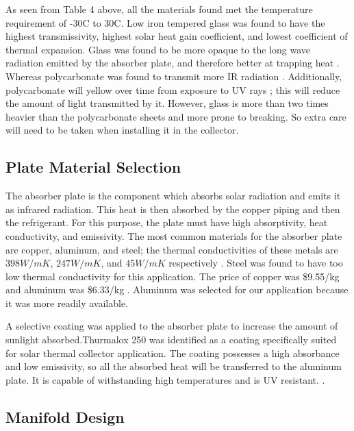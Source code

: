 \medskip
As seen from Table 4 above, all the materials found met the temperature requirement of -30\textdegree C to 30\textdegree C. Low iron tempered glass was found to have the highest transmissivity, highest solar heat gain coefficient, and lowest coefficient of thermal expansion. Glass was found to be more opaque to the long wave radiation emitted by the absorber plate, and therefore better at trapping heat \cite{low_iron_glass_vs_regular}. Whereas polycarbonate was found to transmit more IR radiation \cite{plexiglass}. Additionally, polycarbonate will yellow over time from exposure to UV rays \cite{polycarbonate_yellowing}; this will reduce the amount of light transmitted by it. However, glass is more than two times heavier than the polycarbonate sheets and more prone to breaking. So extra care will need to be taken when installing it in the collector.

\subsection{Plate Material Selection}

The absorber plate is the component which absorbs solar radiation and emits it as infrared radiation. This heat is then absorbed by the copper piping and then the refrigerant. For this purpose, the plate must have high absorptivity, heat conductivity, and emissivity. The most common materials for the absorber plate are copper, aluminum, and steel; the thermal conductivities of these metals are $398 W/mK$, $247 W/mK$, and $45 W/mK$ respectively \cite{thermally_conductive_materials} \cite{thermal_conductivity_of_steel}. Steel was found to have too low thermal conductivity for this application. The price of copper was \$9.55/kg \cite{copper_prices} and aluminum was \$6.33/kg \cite{aluminum_prices}. Aluminum was selected for our application because it was more readily available.

\medskip
A selective coating was applied to the absorber plate to increase the amount of sunlight absorbed.Thurmalox 250 was identified as a coating specifically suited for solar thermal collector application. The coating possesses a high absorbance and low emissivity, so all the absorbed heat will be transferred to the aluminum plate. It is capable of withstanding high temperatures and is  UV resistant. \cite{high_temp_coating}.

\subsection{Manifold Design}

